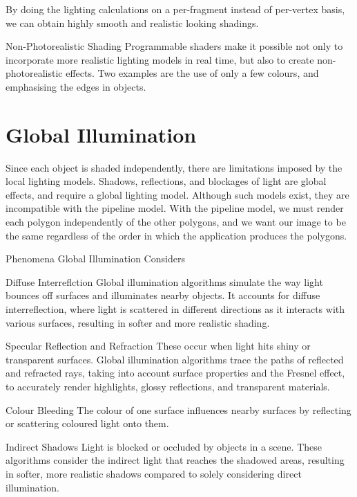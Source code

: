 \documentclass[../COS3712_Notes.tex]{subfiles}
\begin{document}
      By doing the lighting calculations on a per-fragment instead of per-vertex basis,
      we can obtain highly smooth and realistic looking shadings.

      \begin{sidenote}{Non-Photorealistic Shading}
        Programmable shaders make it possible not only to incorporate more realistic lighting
        models in real time, but also to create non-photorealistic effects.
        Two examples are the use of only a few colours, and emphasising the edges in objects.
      \end{sidenote}

    \section{Global Illumination}
      Since each object is shaded independently, there are limitations imposed
      by the local lighting models.
      Shadows, reflections, and blockages of light are global effects, and require a global
      lighting model.
      Although such models exist, they are incompatible with the pipeline model.
      With the pipeline model, we must render each polygon independently of the other polygons,
      and we want our image to be the same regardless of the order in which the application
      produces the polygons.

      \begin{sidenote}{Phenomena Global Illumination Considers}
        $ $\vspace{-1em}
        \begin{descriptimize}[nosep]
          \item[Diffuse Interreflction] Global illumination algorithms simulate the way light
            bounces off surfaces and illuminates nearby objects.
            It accounts for diffuse interreflection, where light is scattered in different
            directions as it interacts with various surfaces, resulting in softer and more
            realistic shading.
          \item[Specular Reflection and Refraction] These occur when light hits shiny
            or transparent surfaces.
            Global illumination algorithms trace the paths of reflected and refracted rays,
            taking into account surface properties and the Fresnel effect,
            to accurately render highlights, glossy reflections, and transparent materials.
          \item[Colour Bleeding] The colour of one surface influences nearby surfaces
            by reflecting or scattering coloured light onto them.
          \item[Indirect Shadows] Light is blocked or occluded by objects in a scene.
            These algorithms consider the indirect light that reaches the shadowed areas,
            resulting in softer, more realistic shadows compared to solely considering
            direct illumination.
        \end{descriptimize}
      \end{sidenote}
\end{document}

